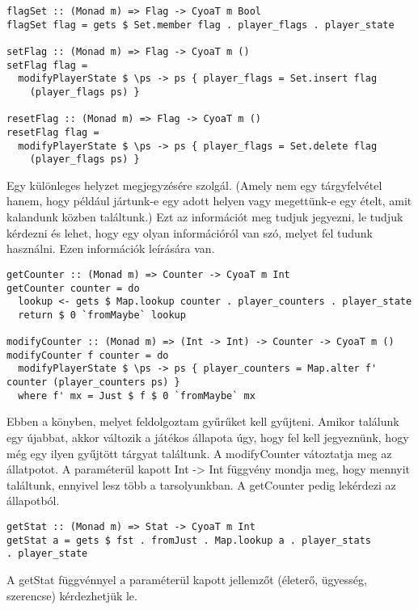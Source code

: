 \documentclass[12pt,a4paper,oneside]{report}
\begin{document}
    \begin{verbatim}
flagSet :: (Monad m) => Flag -> CyoaT m Bool
flagSet flag = gets $ Set.member flag . player_flags . player_state

setFlag :: (Monad m) => Flag -> CyoaT m ()
setFlag flag =
  modifyPlayerState $ \ps -> ps { player_flags = Set.insert flag
    (player_flags ps) }

resetFlag :: (Monad m) => Flag -> CyoaT m ()
resetFlag flag =
  modifyPlayerState $ \ps -> ps { player_flags = Set.delete flag
    (player_flags ps) }
    \end{verbatim}
    Egy különleges helyzet megjegyzésére szolgál. (Amely nem egy
    tárgyfelvétel hanem, hogy például jártunk-e egy adott helyen vagy
    megettünk-e egy ételt, amit kalandunk közben találtunk.) Ezt az
    információt meg tudjuk jegyezni, le tudjuk kérdezni és lehet, hogy
    egy olyan információról van szó, melyet fel tudunk használni. Ezen
    információk leírására van.

    \begin{verbatim}
getCounter :: (Monad m) => Counter -> CyoaT m Int
getCounter counter = do
  lookup <- gets $ Map.lookup counter . player_counters . player_state
  return $ 0 `fromMaybe` lookup

modifyCounter :: (Monad m) => (Int -> Int) -> Counter -> CyoaT m ()
modifyCounter f counter = do
  modifyPlayerState $ \ps -> ps { player_counters = Map.alter f' counter (player_counters ps) }
  where f' mx = Just $ f $ 0 `fromMaybe` mx
    \end{verbatim}
    Ebben a könyben, melyet feldolgoztam gyűrűket kell
    gyűjteni. Amikor találunk egy újabbat, akkor változik a játékos
    állapota úgy, hogy fel kell jegyeznünk, hogy még egy ilyen
    gyűjtött tárgyat találtunk. A modifyCounter vátoztatja meg az
    állatpotot. A paraméterül kapott Int -> Int függvény mondja meg,
    hogy mennyit találtunk, ennyivel lesz több a tarsolyunkban. A
    getCounter pedig lekérdezi az állapotból.

    \begin{verbatim}
getStat :: (Monad m) => Stat -> CyoaT m Int
getStat a = gets $ fst . fromJust . Map.lookup a . player_stats
. player_state
    \end{verbatim}
    A getStat függvénnyel a paraméterül kapott jellemzőt (életerő,
    ügyesség, szerencse) kérdezhetjük le.
\end{document}

